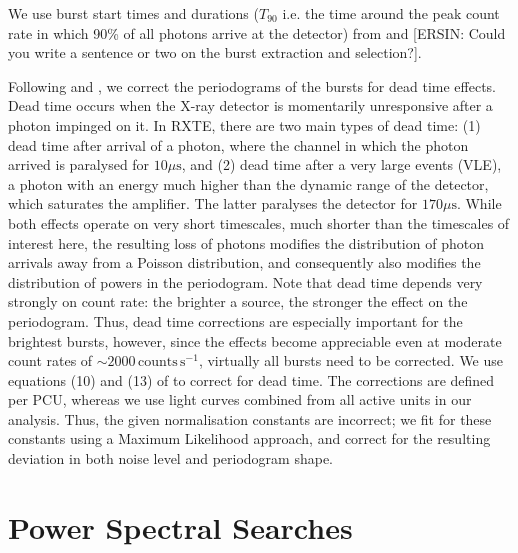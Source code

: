 \documentclass[numberedappendix]{emulateapj}
\begin{document}
We use burst start times and durations ($T_{90}$ i.e. the time around the peak count rate in which 90\% of all photons arrive at the detector) from \citet{gogus1999} and \citet{gogus2000} [ERSIN: Could you write a sentence or two on the burst extraction and selection?]. 

Following \citet{zhang1995} and \citet{jahoda2006}, we correct the periodograms of the bursts for dead time effects. Dead time occurs when the X-ray detector is momentarily unresponsive after a photon impinged on it. In RXTE, there are two main types of dead time: (1) dead time after arrival of a photon, where the channel in which the photon arrived is paralysed for $10\mu\mathrm{s}$, and (2) dead time after a very large events (VLE), a photon with an energy much higher than the dynamic range of the detector, which saturates the amplifier. The latter paralyses the detector for $170\mu\mathrm{s}$. While both effects operate on very short timescales, much shorter than the timescales of interest here, the resulting loss of photons modifies the distribution of photon arrivals away from a Poisson distribution, and consequently also modifies the distribution of powers in the periodogram. Note that dead time depends very strongly on count rate: the brighter a source, the stronger the effect on the periodogram. Thus, dead time corrections are especially important for the brightest bursts, however, since the effects become appreciable even at moderate count rates of $\sim 2000 \,\mathrm{counts}\,\mathrm{s}^{-1}$, virtually all bursts need to be corrected. We use equations (10) and (13) of \citet{jahoda2006} to correct for dead time. The corrections are defined per PCU, whereas we use light curves combined from all active units in our analysis. Thus, the given normalisation constants are incorrect; we fit for these constants using a Maximum Likelihood approach, and correct for the resulting deviation in both noise level and periodogram shape. 


\section{Power Spectral Searches}
\label{sec:analysis}
\end{document}
